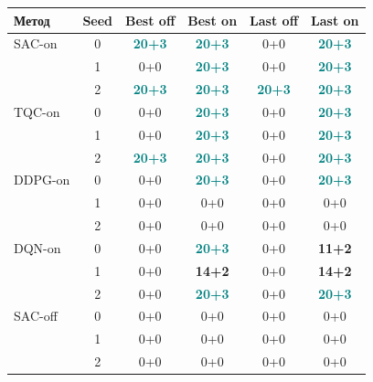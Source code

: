 \begin{tabularx}{\linewidth}{@{}Xccccc@{}}
\toprule Метод & Seed & Best off & Best on & Last off & Last on\\\midrule
SAC-on & 0 & \textcolor{teal}{\textbf{20+3}} & \textcolor{teal}{\textbf{20+3}} & 0+0 & \textcolor{teal}{\textbf{20+3}}\\
 & 1 & 0+0 & \textcolor{teal}{\textbf{20+3}} & 0+0 & \textcolor{teal}{\textbf{20+3}}\\
 & 2 & \textcolor{teal}{\textbf{20+3}} & \textcolor{teal}{\textbf{20+3}} & \textcolor{teal}{\textbf{20+3}} & \textcolor{teal}{\textbf{20+3}}\\
\addlinespace[3pt]
TQC-on & 0 & 0+0 & \textcolor{teal}{\textbf{20+3}} & 0+0 & \textcolor{teal}{\textbf{20+3}}\\
 & 1 & 0+0 & \textcolor{teal}{\textbf{20+3}} & 0+0 & \textcolor{teal}{\textbf{20+3}}\\
 & 2 & \textcolor{teal}{\textbf{20+3}} & \textcolor{teal}{\textbf{20+3}} & 0+0 & \textcolor{teal}{\textbf{20+3}}\\
\addlinespace[3pt]
DDPG-on & 0 & 0+0 & \textcolor{teal}{\textbf{20+3}} & 0+0 & \textcolor{teal}{\textbf{20+3}}\\
 & 1 & 0+0 & 0+0 & 0+0 & 0+0\\
 & 2 & 0+0 & 0+0 & 0+0 & 0+0\\
\addlinespace[3pt]
DQN-on & 0 & 0+0 & \textcolor{teal}{\textbf{20+3}} & 0+0 & \textcolor{warn}{\textbf{11+2}}\\
 & 1 & 0+0 & \textcolor{warn}{\textbf{14+2}} & 0+0 & \textcolor{warn}{\textbf{14+2}}\\
 & 2 & 0+0 & \textcolor{teal}{\textbf{20+3}} & 0+0 & \textcolor{teal}{\textbf{20+3}}\\
\addlinespace[3pt]
SAC-off & 0 & 0+0 & 0+0 & 0+0 & 0+0\\
 & 1 & 0+0 & 0+0 & 0+0 & 0+0\\
 & 2 & 0+0 & 0+0 & 0+0 & 0+0\\
\bottomrule
\end{tabularx}
